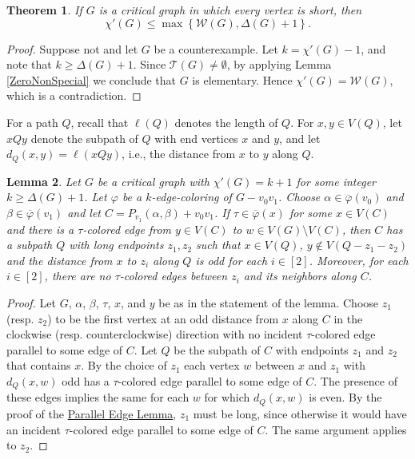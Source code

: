 \documentclass[12pt]{article}
\theoremstyle{plain}
\newtheorem{thm}{Theorem}
\newtheorem{lem}[thm]{Lemma}
\theoremstyle{definition}
\theoremstyle{remark}
\newcommand{\fancy}[1]{\mathcal{#1}}
\newcommand{\W}{\fancy{W}}
\newcommand{\T}{\fancy{T}}
\newcommand{\set}[1]{\left\{ #1 \right\}}
\newcommand{\irange}[1]{\left[#1\right]}
\newcommand{\vph}{\varphi}
\newcommand{\vphn}{\overline{\varphi}}
\begin{document}
\begin{thm}\label{AllSpecialImpliesElementary}
If $G$ is a critical graph in which every vertex is short, then
\[\chi'(G) \le \max \set{\W(G), \Delta(G) + 1}.\]
\end{thm}
\begin{proof}
Suppose not and let $G$ be a counterexample. %
Let $k = \chi'(G) - 1$, and note that $k \ge \Delta(G) + 1$.  
Since $\T(G) \ne \emptyset$, by applying Lemma \ref{ZeroNonSpecial} we conclude
that $G$ is elementary.  Hence $\chi'(G) = \W(G)$, which is a
contradiction.
\end{proof}

For a path $Q$, recall that $\ell(Q)$ denotes the length of $Q$.
For $x,y \in V(Q)$, let $xQy$ denote the subpath of $Q$ with
end vertices $x$ and $y$, and let $d_Q(x,y) = \ell(xQy)$, i.e., the distance
from $x$ to $y$ along $Q$.

\begin{lem}\label{TauEscape}
Let $G$ be a critical graph with $\chi'(G) = k+1$ for some integer $k \ge \Delta(G) + 1$.
Let $\vph$ be a $k$-edge-coloring of $G-v_0v_1$. Choose $\alpha \in \vphn(v_0)$
and $\beta \in \vphn(v_1)$ and let $C = P_{v_1}(\alpha, \beta) + v_0v_1$.  If
$\tau \in \vphn(x)$ for some $x \in V(C)$ and there is a $\tau$-colored edge
from $y \in V(C)$ to $w \in V(G) \setminus V(C)$, then $C$ has a subpath $Q$
with long endpoints $z_1,z_2$ such that $x \in V(Q)$, $y \not \in V(Q-z_1-z_2)$
and the distance from $x$ to $z_i$ along $Q$ is odd for each $i \in \irange{2}$. 
Moreover, for each $i \in \irange{2}$, there are no $\tau$-colored edges
between $z_i$ and its neighbors along $C$.
\end{lem}
\begin{proof}
Let $G$, $\alpha$, $\beta$, $\tau$, $x$, and $y$ be as in the statement of the
lemma.  Choose $z_1$ (resp. $z_2$) to be the first vertex at an odd distance
from $x$ along $C$ in the clockwise (resp. counterclockwise) direction with no
incident $\tau$-colored edge parallel to some edge of $C$.  
Let $Q$ be the subpath of $C$ with endpoints $z_1$ and $z_2$ that contains $x$.
By the choice of $z_1$ each vertex $w$ between $x$ and $z_1$ with $d_Q(x,w)$ odd
has a $\tau$-colored edge parallel to some edge of $C$.  The presence of these
edges implies the same for each $w$ for which $d_Q(x,w)$ is even.  By the proof
of 
the \hyperref[SpecialPath]{Parallel Edge Lemma}, 
$z_1$ must be long, since otherwise it would have an
incident $\tau$-colored edge parallel to some edge of $C$.  The same argument
applies to $z_2$.
%
\end{proof}
\end{document}
